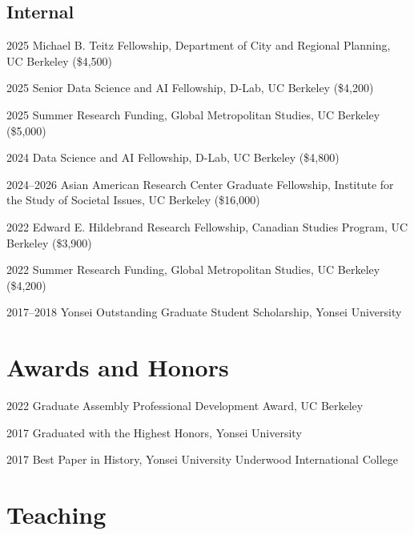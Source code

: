 \documentclass[11pt,letterpaper]{article}
\newcommand{\money}[1]{(\$#1)}
\begin{document}
\subsection{Internal}
\begin{tablist}
  \item[2025] \tab{}Michael B. Teitz Fellowship, Department of City and Regional Planning, UC Berkeley \money{4,500}
  \item[2025] \tab{}Senior Data Science and AI Fellowship, D-Lab, UC Berkeley \money{4,200}
  \item[2025] \tab{}Summer Research Funding, Global Metropolitan Studies, UC Berkeley \money{5,000}
  \item[2024] \tab{}Data Science and AI Fellowship, D-Lab, UC Berkeley \money{4,800}
  \item[2024–2026] \tab{}Asian American Research Center Graduate Fellowship, Institute for the Study of Societal Issues, UC Berkeley \money{16,000}
  \item[2022] \tab{}Edward E. Hildebrand Research Fellowship, Canadian Studies Program, UC Berkeley \money{3,900}
  \item[2022] \tab{}Summer Research Funding, Global Metropolitan Studies, UC Berkeley \money{4,200}
  \item[2017–2018] \tab{}Yonsei Outstanding Graduate Student Scholarship, Yonsei University
\end{tablist}

\section{Awards and Honors}
\begin{tablist}
  \item[2022] \tab{}Graduate Assembly Professional Development Award, UC Berkeley
  \item[2017] \tab{}Graduated with the Highest Honors, Yonsei University
  \item[2017] \tab{}Best Paper in History, Yonsei University Underwood International College
\end{tablist}

\section{Teaching}
\end{document}

